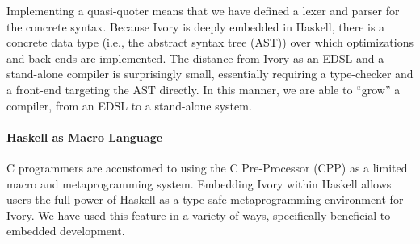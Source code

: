 Implementing a quasi-quoter means that we have defined a lexer and parser for
the concrete syntax. Because Ivory is deeply embedded in Haskell, there is a
concrete data type (i.e., the abstract syntax tree (AST)) over which
optimizations and back-ends are implemented. The distance from Ivory as an EDSL
and a stand-alone compiler is surprisingly small, essentially requiring a
type-checker and a front-end targeting the AST directly. In this manner, we are
able to ``grow'' a compiler, from an EDSL to a stand-alone system.


\paragraph{Haskell as Macro Language}

C programmers are accustomed to using the C Pre-Processor (CPP) as a
limited macro and metaprogramming system.  Embedding Ivory within
Haskell allows users the full power of Haskell as a type-safe
metaprogramming environment for Ivory. We have used this feature in a
variety of ways, specifically beneficial to embedded development.



